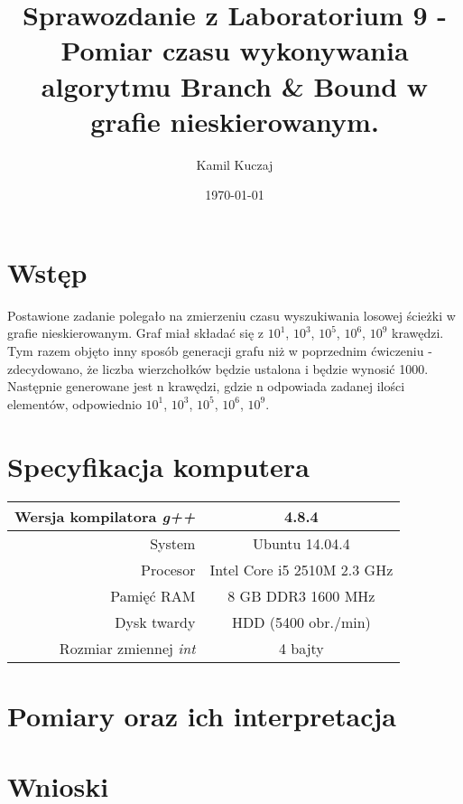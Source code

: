\documentclass[11pt,a4paper]{article}
\author{Kamil Kuczaj}
\title{Sprawozdanie z Laboratorium 9 - Pomiar czasu wykonywania algorytmu Branch \& Bound w grafie nieskierowanym.}
\date{\today}
\begin{document}
\maketitle

\section{Wstęp}
\hspace{4ex}Postawione zadanie polegało na zmierzeniu czasu wyszukiwania losowej ścieżki w grafie nieskierowanym. Graf miał składać się z $10^1$, $10^3$, $10^5$, $10^6$, $10^9$ krawędzi. Tym razem objęto inny sposób generacji grafu niż w poprzednim ćwiczeniu - zdecydowano, że liczba wierzchołków będzie ustalona i będzie wynosić 1000. Następnie generowane jest n krawędzi, gdzie n odpowiada zadanej ilości elementów, odpowiednio $10^1$, $10^3$, $10^5$, $10^6$, $10^9$.

\section{Specyfikacja komputera}

\begin{center}
	\begin{tabular}{| r | c |}
	\hline
	Wersja kompilatora \textit{g++} & 4.8.4 \\ \hline
	System & Ubuntu 14.04.4 \\ \hline
	Procesor	 & Intel Core i5 2510M 2.3 GHz \\ \hline
	Pamięć RAM & 8 GB DDR3 1600 MHz \\ \hline
	Dysk twardy & HDD (5400 obr./min) \\ \hline
	Rozmiar zmiennej \textit{int} & 4 bajty \\ \hline
	\end{tabular}
\end{center}

\section{Pomiary oraz ich interpretacja}


\section{Wnioski}
\hspace{4ex}
\end{document}
